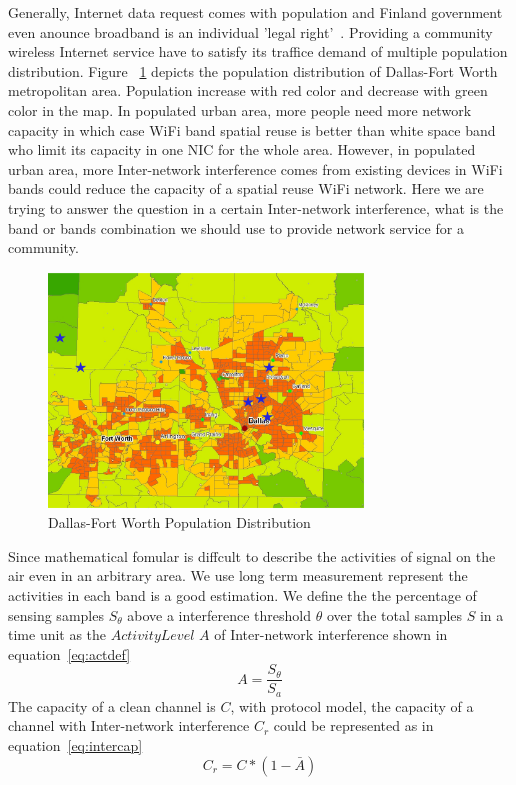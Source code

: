 Generally, Internet data request comes with population and Finland government even anounce 
broadband is an individual 'legal right'~\cite{bbcfinland,rosston2011household}. Providing a community 
wireless Internet service have to satisfy its traffice demand of multiple population distribution. 
Figure ~\ref{fig:dfwpopulation} depicts the population distribution of Dallas-Fort Worth 
metropolitan area. Population increase with red color and decrease with green color in the map.
In populated urban area, more people need more network capacity in which case WiFi 
band spatial reuse is better than white space band who limit its capacity in one NIC for the whole area.
However, in populated urban area, more Inter-network interference comes from existing devices in WiFi
 bands could reduce the capacity of a spatial reuse WiFi network. 
 Here we are trying to answer the question in a certain Inter-network interference,
 what is the band or bands combination we should use to provide network service
  for a community.
	  
   \begin{figure}
   \centering
   \includegraphics[width=84mm]{figures/experimentloc}
   \vspace{-0.1in}
   \caption{Dallas-Fort Worth Population Distribution}                                                                 
   \label{fig:dfwpopulation}
   \end{figure}

Since mathematical fomular is diffcult to describe the activities of signal on the air even in an arbitrary area.
 We use long term measurement represent the activities in each band is a good
  estimation. We define the the percentage of sensing samples $S_\theta$ above a 
  interference threshold $\theta$ over the total samples $S$ in a time unit as the 
  {\it $Activity Level$} $A$ of Inter-network interference shown in equation~\ref{eq:actdef}
\begin{equation}
\label{eq:actdef}
A=\frac{S_\theta}{S_a}
\end{equation}
The capacity of a clean channel is $C$, with protocol model, the capacity of a channel with Inter-network
 interference $C_r$ could be represented as in equation~\ref{eq:intercap}
\begin{equation}
\label{eq:intercap}
C_r=C*(1-\bar{A})
\end{equation}

